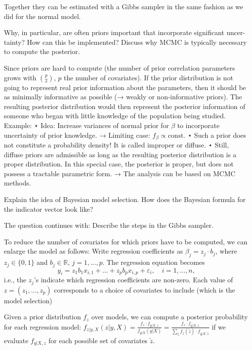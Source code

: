 Together they can be estimated with a Gibbs sampler in the same fashion as we did for the normal model.

Why, in particular, are often priors important that incorporate significant uncer-
tainty? How can this be implemented? Discuss why MCMC is typically necessary to compute the posterior. 

Since priors are hard to compute (the number of prior correlation parameters grows with \( \binom{p}{2} \), \( p \) the number of covariates).
If the prior distribution is not going to represent real prior information about the parameters, then it
should be as minimally informative as possible (→ weakly or non-informative priors).
The resulting posterior distribution would then represent the posterior information of someone who began with
little knowledge of the population being studied.
Example:
⋆ Idea: Increase variances of normal prior for \( \beta \) to incorporate uncertainty of prior knowledge.
→ Limiting case: \(f_\beta \propto \text{const.}\)
⋆ Such a prior does not constitute a probability density! It is called improper or diffuse.
⋆ Still, diffuse priors are admissible as long as the resulting posterior distribution is a proper distribution. In this special case,
the posterior is proper, but does not possess a tractable parametric form.
→ The analysis can be based on MCMC methods.


Explain the idea of Bayesian model selection. How does the Bayesian formula for the indicator vector look like? 

The question continues with:
Describe the steps in the Gibbs sampler.

To reduce the number of covariates for which priors have to be computed, we can enlarge the model as follows:
Write regression coefficients as \(\beta_j = z_j \cdot b_j\), where \(z_j \in \{0, 1\}\) and \(b_j \in \mathbb{R}\), \(j = 1, ..., p\).
The regression equation becomes
\[
y_i = z_1 b_1 x_{i,1} + ... + z_p b_p x_{i,p} + \varepsilon_i, \quad i = 1, ..., n,
\]
i.e., the \(z_j\)'s indicate which regression coefficients are non-zero.
Each value of \(z = (z_1, ..., z_p)\) corresponds to a choice of covariates to include (which is the model selection)

Given a prior distribution \(f_z\) over models, we can compute a posterior probability for each regression model:
\(
f_{z | y, X}(z | y, X) = \frac{f_z \cdot f_{y | X, z}}{f_{y | X}(y | X)} = \frac{f_z \cdot f_{y | X, z}}{\sum_{\tilde{z}} f_z(\tilde{z}) \cdot f_{y | X, \tilde{z}}}
\)
if we evaluate \(f_{y | X, z}\) for each possible set of covariates \(\tilde{z}\).

